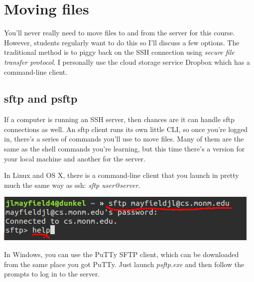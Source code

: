 \documentclass[]{tufte-handout}
\begin{document}
\section{Moving files}

You'll never really need to move files to and from the server for this course.  However, students regularly want to do this so I'll discuss a few options.  The traditional method is to piggy back on the SSH connection using \textit{secure file transfer protocol}. I personally use the cloud storage service Dropbox which has a command-line client. 

\subsection{sftp and psftp}

If a computer is running an SSH server, then chances are it can handle sftp connections as well.  An sftp client runs its own little CLI, so once you're logged in, there's a series of commands you'll use to move files. Many of them are the same as the shell commands you're learning, but this time there's a version for your local machine and another for the server.

In Linux and OS X, there is a command-line client that you launch in pretty much the same way as ssh: \textit{sftp user@server}. 

\vspace{.1in}
\begin{center}
\includegraphics[scale=.5]{linux-sftplogin.png}
\end{center}
\vspace{.1in}

In Windows, you can use the PuTTy SFTP client, which can be downloaded from the same place you got PuTTy. Just launch \textit{psftp.exe} and then follow the prompts to log in to the server. 
\end{document}

